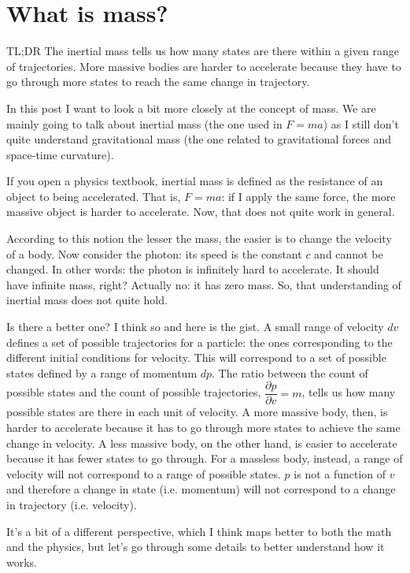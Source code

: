 \documentclass[aps,pra,10pt,floatfix,nofootinbib]{revtex4-1}
\theoremstyle{definition}
\begin{document}
	
\section{What is mass?}

TL;DR The inertial mass tells us how many states are there within a given range of trajectories. More massive bodies are harder to accelerate because they have to go through more states to reach the same change in trajectory.

In this post I want to look a bit more closely at the concept of mass. We are mainly going to talk about inertial mass (the one used in $F=ma$) as I still don't quite understand gravitational mass (the one related to gravitational forces and space-time curvature).

If you open a physics textbook, inertial mass is defined as the resistance of an object to being accelerated. That is, $F=ma$: if I apply the same force, the more massive object is harder to accelerate. Now, that does not quite work in general.

According to this notion the lesser the mass, the easier is to change the velocity of a body. Now consider the photon: its speed is the constant $c$ and cannot be changed. In other words: the photon is infinitely hard to accelerate. It should have infinite mass, right? Actually no: it has zero mass. So, that understanding of inertial mass does not quite hold.

Is there a better one? I think so and here is the gist. A small range of velocity $dv$ defines a set of possible trajectories for a particle: the ones corresponding to the different initial conditions for velocity. This will correspond to a set of possible states defined by a range of momentum $dp$. The ratio between the count of possible states and the count of possible trajectories, $\dfrac{\partial p}{\partial v} = m$, tells us how many possible states are there in each unit of velocity. A more massive body, then, is harder to accelerate because it has to go through more states to achieve the same change in velocity. A less massive body, on the other hand, is easier to accelerate because it has fewer states to go through. For a massless body, instead, a range of velocity will not correspond to a range of possible states. $p$ is not a function of $v$ and therefore a change in state (i.e. momentum) will not correspond to a change in trajectory (i.e. velocity).

It's a bit of a different perspective, which I think maps better to both the math and the physics, but let's go through some details to better understand how it works.
\end{document}

